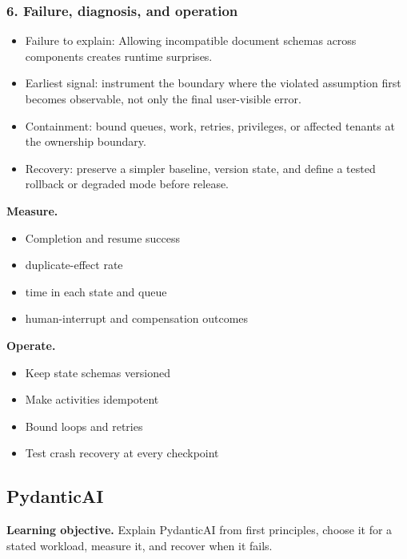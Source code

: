 \subsubsection*{6. Failure, diagnosis, and operation}
\begin{itemize}
\item Failure to explain: Allowing incompatible document schemas across components creates runtime surprises.
\item Earliest signal: instrument the boundary where the violated assumption first becomes observable, not only the final user-visible error.
\item Containment: bound queues, work, retries, privileges, or affected tenants at the ownership boundary.
\item Recovery: preserve a simpler baseline, version state, and define a tested rollback or degraded mode before release.
\end{itemize}
\textbf{Measure.}\begin{itemize}
\item Completion and resume success
\item duplicate-effect rate
\item time in each state and queue
\item human-interrupt and compensation outcomes
\end{itemize}
\textbf{Operate.}\begin{itemize}
\item Keep state schemas versioned
\item Make activities idempotent
\item Bound loops and retries
\item Test crash recovery at every checkpoint
\end{itemize}
\subsection{PydanticAI}
\textbf{Learning objective.} Explain PydanticAI from first principles, choose it for a stated workload, measure it, and recover when it fails.
